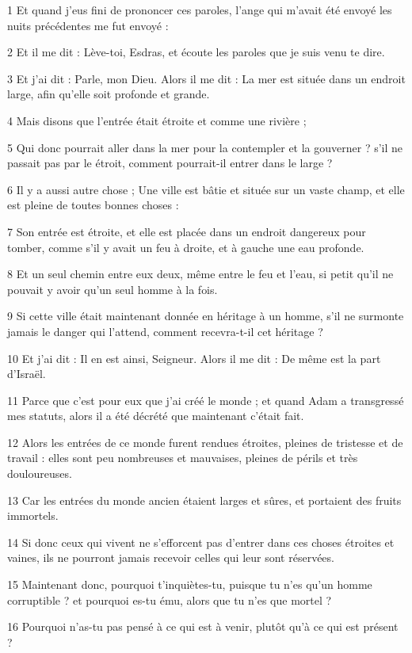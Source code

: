 \par 1 Et quand j'eus fini de prononcer ces paroles, l'ange qui m'avait été envoyé les nuits précédentes me fut envoyé :
\par 2 Et il me dit : Lève-toi, Esdras, et écoute les paroles que je suis venu te dire.
\par 3 Et j'ai dit : Parle, mon Dieu. Alors il me dit : La mer est située dans un endroit large, afin qu'elle soit profonde et grande.
\par 4 Mais disons que l'entrée était étroite et comme une rivière ;
\par 5 Qui donc pourrait aller dans la mer pour la contempler et la gouverner ? s'il ne passait pas par le étroit, comment pourrait-il entrer dans le large ?
\par 6 Il y a aussi autre chose ; Une ville est bâtie et située sur un vaste champ, et elle est pleine de toutes bonnes choses :
\par 7 Son entrée est étroite, et elle est placée dans un endroit dangereux pour tomber, comme s'il y avait un feu à droite, et à gauche une eau profonde.
\par 8 Et un seul chemin entre eux deux, même entre le feu et l'eau, si petit qu'il ne pouvait y avoir qu'un seul homme à la fois.
\par 9 Si cette ville était maintenant donnée en héritage à un homme, s'il ne surmonte jamais le danger qui l'attend, comment recevra-t-il cet héritage ?
\par 10 Et j'ai dit : Il en est ainsi, Seigneur. Alors il me dit : De même est la part d'Israël.
\par 11 Parce que c'est pour eux que j'ai créé le monde ; et quand Adam a transgressé mes statuts, alors il a été décrété que maintenant c'était fait.
\par 12 Alors les entrées de ce monde furent rendues étroites, pleines de tristesse et de travail : elles sont peu nombreuses et mauvaises, pleines de périls et très douloureuses.
\par 13 Car les entrées du monde ancien étaient larges et sûres, et portaient des fruits immortels.
\par 14 Si donc ceux qui vivent ne s'efforcent pas d'entrer dans ces choses étroites et vaines, ils ne pourront jamais recevoir celles qui leur sont réservées.
\par 15 Maintenant donc, pourquoi t'inquiètes-tu, puisque tu n'es qu'un homme corruptible ? et pourquoi es-tu ému, alors que tu n'es que mortel ?
\par 16 Pourquoi n'as-tu pas pensé à ce qui est à venir, plutôt qu'à ce qui est présent ?
